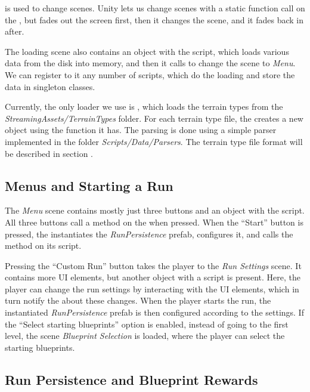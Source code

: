  is used to change scenes.
Unity lets us change scenes with a static function call on the , but  fades out the screen first, then it changes the scene, and it fades back in after.

The loading scene also contains an object with the  script, which loads various data from the disk into memory, and then it calls to change the scene to \emph{Menu}.
We can register to it any number of  scripts, which do the loading and store the data in singleton classes.

Currently, the only loader we use is , which loads the terrain types from the \emph{StreamingAssets/TerrainTypes} folder.
For each terrain type file, the  creates a new  object using the function  it has.
The parsing is done using a simple parser implemented in the folder \emph{Scripts/Data/Parsers}.
The terrain type file format will be described in section .

\subsection{Menus and Starting a Run}

The \emph{Menu} scene contains mostly just three buttons and an object with the  script.
All three buttons call a method on the  when pressed.
When the \enquote{Start} button is pressed, the  instantiates the \emph{RunPersistence} prefab, configures it, and calls the  method on its  script.

Pressing the \enquote{Custom Run} button takes the player to the \emph{Run Settings} scene.
It contains more UI elements, but another object with a  script is present.
Here, the player can change the run settings by interacting with the UI elements, which in turn notify the  about these changes.
When the player starts the run, the instantiated \emph{RunPersistence} prefab is then configured according to the settings.
If the \enquote{Select starting blueprints} option is enabled, instead of going to the first level, the scene \emph{Blueprint Selection} is loaded, where the player can select the starting blueprints.

\subsection{Run Persistence and Blueprint Rewards}


